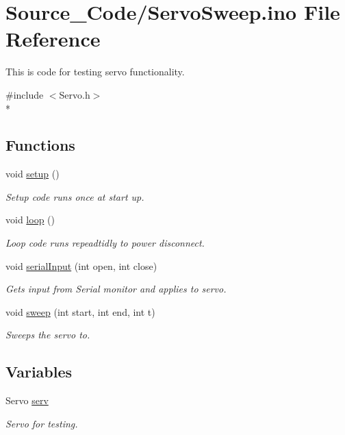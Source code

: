 \hypertarget{_servo_sweep_8ino}{\section{Source\-\_\-\-Code/\-Servo\-Sweep.ino File Reference}
\label{_servo_sweep_8ino}
}


This is code for testing servo functionality.  


{\ttfamily \#include $<$Servo.\-h$>$}\\*
\subsection*{Functions}
\begin{DoxyCompactItemize}
\item 
void \hyperlink{_servo_sweep_8ino_a4fc01d736fe50cf5b977f755b675f11d}{setup} ()
\begin{DoxyCompactList}\small\item\em Setup code runs once at start up. \end{DoxyCompactList}\item 
void \hyperlink{_servo_sweep_8ino_afe461d27b9c48d5921c00d521181f12f}{loop} ()
\begin{DoxyCompactList}\small\item\em Loop code runs repeadtidly to power disconnect. \end{DoxyCompactList}\item 
void \hyperlink{_servo_sweep_8ino_aececb11ecdc97d45c51aaf92c8016006}{serial\-Input} (int open, int close)
\begin{DoxyCompactList}\small\item\em Gets input from Serial monitor and applies to servo. \end{DoxyCompactList}\item 
void \hyperlink{_servo_sweep_8ino_a28ce3d1389c3b021d9ad0a86770dbeb7}{sweep} (int start, int end, int t)
\begin{DoxyCompactList}\small\item\em Sweeps the servo to. \end{DoxyCompactList}\end{DoxyCompactItemize}
\subsection*{Variables}
\begin{DoxyCompactItemize}
\item 
\hypertarget{_servo_sweep_8ino_a9488c8d7a3c4603f10af1b9985a0fedf}{Servo \hyperlink{_servo_sweep_8ino_a9488c8d7a3c4603f10af1b9985a0fedf}{serv}}\label{_servo_sweep_8ino_a9488c8d7a3c4603f10af1b9985a0fedf}

\begin{DoxyCompactList}\small\item\em Servo for testing. \end{DoxyCompactList}\end{DoxyCompactItemize}


